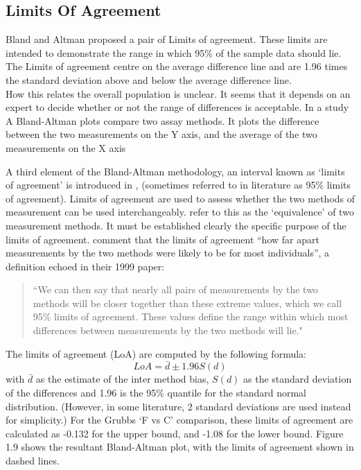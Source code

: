 \documentclass[Main.tex]{subfiles}
\begin{document}
	\subsection{Limits Of Agreement}
	Bland and Altman proposed a pair of Limits of agreement. These
	limits are intended to demonstrate the range in which 95\% of the
	sample data should lie. The Limits of agreement centre on the
	average difference line and are 1.96 times the standard deviation
	above and below the average difference line.
	\\
	How this relates the overall population is unclear. It seems that
	it depends on an expert to decide whether or not the range of
	differences is acceptable. In a study A Bland-Altman plots compare
	two assay methods. It plots the difference between the two
	measurements on the Y axis, and the average of the two
	measurements on the X axis
	
	A third element of the Bland-Altman methodology, an interval known
	as `limits of agreement' is introduced in \citet*{BA86},
	(sometimes referred to in literature as 95\% limits of agreement).
	Limits of agreement are used to assess whether the two methods of
	measurement can be used interchangeably. \citet{BA86} refer to
	this as the `equivalence' of two measurement methods. It must be
	established clearly the specific purpose of the limits of
	agreement. \citet*{BA95} comment that the limits of agreement
	``how far apart measurements by the two methods were likely to be
	for most individuals'', a definition echoed in their 1999 paper:
	
	\begin{quote} ``We can then say that nearly all pairs
		of measurements by the two methods will be closer together than
		these extreme values, which we call 95\% limits of agreement.
		These values define the range within which most differences
		between measurements by the two methods will lie."
	\end{quote}
	
	The limits of agreement (LoA) are computed by the following
	formula:
	\begin{equation}
	LoA = \bar{d} \pm 1.96 S(d)
	\end{equation}
	with $\bar{d}$ as the estimate of the inter method bias, $S(d)$ as
	the standard deviation of the differences and 1.96 is the 95\%
	quantile for the standard normal distribution. (However, in some
	literature, 2 standard deviations are used instead for
	simplicity.) For the Grubbs `F vs C' comparison, these limits of
	agreement are calculated as -0.132 for the upper bound, and -1.08
	for the lower bound. Figure 1.9 shows the resultant Bland-Altman
	plot, with the limits of agreement shown in dashed lines.
	
\end{document}

